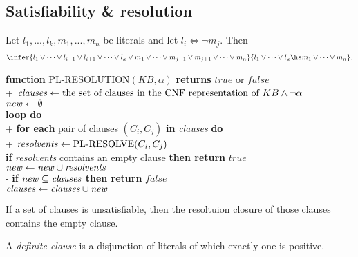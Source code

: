 \documentclass{article}
\begin{document}
\subsection{Satisfiability \& resolution}

\begin{theorem}
    Let $l_1,...,l_k,m_1,...,m_n$ be literals and let $l_i\Leftrightarrow\neg m_j$. Then
    \begin{align*}
        \infer{l_1\vee \cdots\vee l_{i-1}\vee l_{i+1}\vee\cdots\vee l_k\vee m_1\vee\cdots\vee m_{j-1}\vee m_{j+1}\vee \cdots\vee m_n}{
            l_1\vee\cdots \vee l_k\hs m_1\vee\cdots\vee m_n
        }.
    \end{align*}
\end{theorem}

\begin{pseudo}
    \textbf{function} PL-RESOLUTION$(KB,\alpha)$ \textbf{returns} $true$ or $false$\\+
        $\text{\emph{clauses}}\leftarrow \text{the set of clauses in the CNF representation of }KB\wedge\neg\alpha$\\
        $\text{\emph{new}}\leftarrow\emptyset$\\
        \textbf{loop do}\\+
            \textbf{for each} pair of clauses $(C_i,C_j)$ \textbf{in} \emph{clauses} \textbf{do}\\+
                $\text{\emph{resolvents}}\leftarrow\text{PL-RESOLVE}(C_i,C_j)$\\
                \textbf{if} \emph{resolvents} contains an empty clause \textbf{then return} $true$\\
                $\text{\emph{new}}\leftarrow \text{\emph{new}}\cup \text{\emph{resolvents}}$\\-
            \textbf{if} $\text{\emph{new}} \subseteq \text{\emph{clauses}}$ \textbf{then return} $false$\\
            $\text{\emph{clauses}}\leftarrow\text{\emph{clauses}}\cup\text{\emph{new}}$
\end{pseudo}

\begin{theorem}
    If a set of clauses is unsatisfiable, then the resoltuion closure of
    those clauses contains the empty clause. 
\end{theorem}

\begin{definition}
    A \emph{definite clause} is a disjunction of literals of which
    exactly one is positive.
\end{definition}
\end{document}
